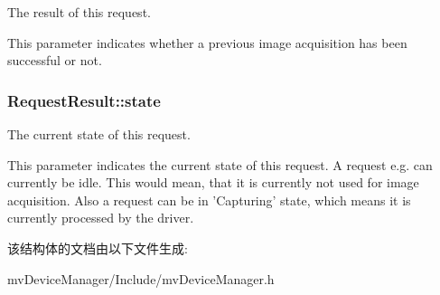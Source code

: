 The result of this request. 

This parameter indicates whether a previous image acquisition has been successful or not. \hypertarget{struct_request_result_a4dd2118f067f90283440567f2319cf90}{
\subsubsection[{state}]{ Request\+Result\+::state}}\label{struct_request_result_a4dd2118f067f90283440567f2319cf90}


The current state of this request. 

This parameter indicates the current state of this request. A request e.\+g. can currently be idle. This would mean, that it is currently not used for image acquisition. Also a request can be in 'Capturing' state, which means it is currently processed by the driver. 

该结构体的文档由以下文件生成\+:\begin{DoxyCompactItemize}
\item 
mv\+Device\+Manager/\+Include/mv\+Device\+Manager.\+h\end{DoxyCompactItemize}
